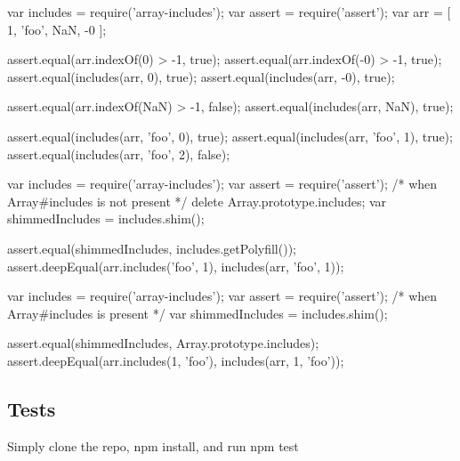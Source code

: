 \begin{DoxyCode}
var includes = require('array-includes');
var assert = require('assert');
var arr = [
    1,
    'foo',
    NaN,
    -0
];

assert.equal(arr.indexOf(0) > -1, true);
assert.equal(arr.indexOf(-0) > -1, true);
assert.equal(includes(arr, 0), true);
assert.equal(includes(arr, -0), true);

assert.equal(arr.indexOf(NaN) > -1, false);
assert.equal(includes(arr, NaN), true);

assert.equal(includes(arr, 'foo', 0), true);
assert.equal(includes(arr, 'foo', 1), true);
assert.equal(includes(arr, 'foo', 2), false);
\end{DoxyCode}



\begin{DoxyCode}
var includes = require('array-includes');
var assert = require('assert');
/* when Array#includes is not present */
delete Array.prototype.includes;
var shimmedIncludes = includes.shim();

assert.equal(shimmedIncludes, includes.getPolyfill());
assert.deepEqual(arr.includes('foo', 1), includes(arr, 'foo', 1));
\end{DoxyCode}



\begin{DoxyCode}
var includes = require('array-includes');
var assert = require('assert');
/* when Array#includes is present */
var shimmedIncludes = includes.shim();

assert.equal(shimmedIncludes, Array.prototype.includes);
assert.deepEqual(arr.includes(1, 'foo'), includes(arr, 1, 'foo'));
\end{DoxyCode}


\subsection*{Tests}

Simply clone the repo, {\ttfamily npm install}, and run {\ttfamily npm test} 